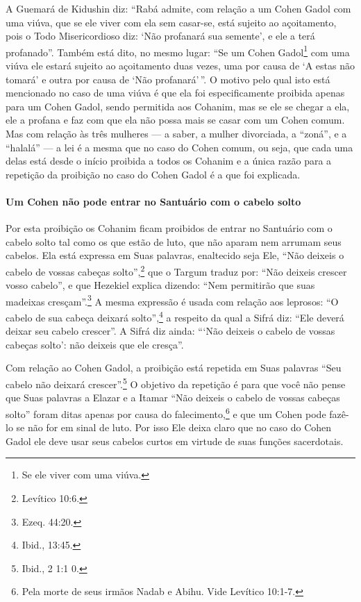 A Guemará de Kidushin diz: ``Rabá admite, com relação a um Cohen
Gadol com uma viúva, que se ele viver com ela sem casar-se, está
sujeito ao açoitamento, pois o Todo Misericordioso diz: `Não profanará
sua semente', e ele a terá profanado''. Também está dito, no mesmo
lugar: ``Se um Cohen Gadol\footnote{Se ele viver com uma viúva.} com uma viúva ele estará sujeito ao açoitamento duas vezes, uma por causa de `A estas não
tomará' e outra por causa de `Não profanará'\,''. O motivo pelo qual isto
está mencionado no caso de uma viúva é que ela foi especificamente
proibida apenas para um Cohen Gadol, sendo permitida aos
Cohanim, mas se ele se chegar a ela, ele a profana e faz com que
ela não possa mais se casar com um Cohen comum. Mas com relação às
três mulheres --- a saber, a mulher divorciada, a ``zoná'', e a ``halalá'' --- a lei é a mesma que no caso do Cohen comum, ou seja, que cada uma delas está desde o
início proibida a todos os Cohanim e a única razão para a repetição
da proibição no caso do Cohen Gadol é a que foi explicada.

\paragraph{Um Cohen não pode entrar no Santuário com o cabelo solto}

Por esta proibição os Cohanim ficam proibidos de entrar no Santuário
com o cabelo solto tal como os que estão de luto, que não aparam nem
arrumam seus cabelos. Ela está expressa em Suas palavras, enaltecido
seja Ele, ``Não deixeis o cabelo de vossas cabeças solto'',\footnote{Levítico
10:6.} que o Targum traduz por: ``Não deixeis crescer vosso cabelo'', e
que Hezekiel explica dizendo: ``Nem permitirão que suas madeixas
cresçam''.\footnote{Ezeq. 44:20.} A mesma expressão é usada com relação
aos leprosos: ``O cabelo de sua cabeça deixará solto'',\footnote{Ibid., 13:45.} a
respeito da qual a Sifrá diz: ``Ele deverá deixar seu cabelo crescer''.
A Sifrá diz ainda: ```Não deixeis o cabelo de vossas cabeças solto': não
deixeis que ele cresça''.

Com relação ao Cohen Gadol, a proibição está repetida em Suas
palavras ``Seu cabelo não deixará crescer''.\footnote{Ibid., 2 1:1 0.} O objetivo
da repetição é para que você não pense que Suas palavras a Elazar e a
Itamar ``Não deixeis o cabelo de vossas cabeças solto'' foram ditas
apenas por causa do falecimento,\footnote{Pela morte de seus irmãos Nadab e Abihu. Vide Levítico 10:1-7.} e que um
Cohen pode fazê-lo se não for em sinal de luto. Por isso Ele deixa
claro que no caso do Cohen Gadol ele deve usar seus cabelos curtos
em virtude de suas funções sacerdotais.

